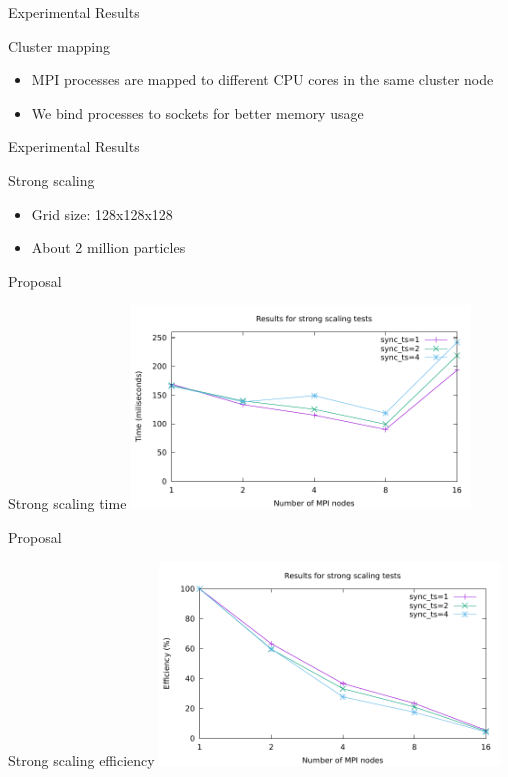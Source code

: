 \documentclass[aspectratio=43,t]{beamer}
\begin{document}
  \begin{frame}{Experimental Results}
    \begin{block}{Cluster mapping}
      \begin{itemize}
        \item MPI processes are mapped to different CPU cores in the same cluster node
        \item We bind processes to sockets for better memory usage
      \end{itemize}
    \end{block}
  \end{frame}

  \begin{frame}{Experimental Results}
    \begin{block}{Strong scaling}
      \begin{itemize}
        \item Grid size: 128x128x128
        \item About 2 million particles
      \end{itemize}
    \end{block}
  \end{frame}

  \begin{frame}{Proposal}
    \begin{block}{Strong scaling time}
      \includegraphics[width=9cm]{results/strong_scaling.pdf}
    \end{block}
  \end{frame}

  \begin{frame}{Proposal}
    \begin{block}{Strong scaling efficiency}
      \includegraphics[width=9cm]{results/strong_scaling_eff.pdf}
    \end{block}
  \end{frame}
\end{document}

